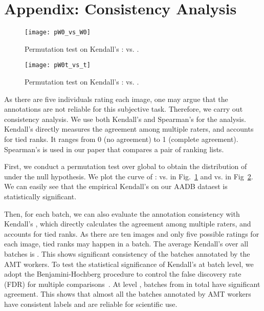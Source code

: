 \documentclass[runningheads]{llncs}
\begin{document}
\section*{Appendix: Consistency Analysis}
\label{sec:consistencyAnalysis}

\begin{figure}[t]
\centering
   \texttt{[image: pW0\_vs\_W0]}
\vspace*{-4mm}
   \caption{Permutation test on Kendall's :  vs. .}
\label{fig:pW0_vs_W0}
\end{figure}

\begin{figure}[t]
\centering
   \texttt{[image: pW0t\_vs\_t]}
\vspace*{-4mm}
   \caption{Permutation test on Kendall's :  vs. .}
\label{fig:pW0t_vs_t}
\end{figure}

As there are five individuals rating each image,
one may argue that the annotations are not reliable for this subjective task.
Therefore,
we carry out consistency analysis.
We use both Kendall's  and Spearman's  for the analysis.
Kendall's  directly measures the agreement among multiple raters, and accounts for tied ranks.
It ranges from 0 (no agreement) to 1 (complete agreement).
Spearman's  is used in our paper that compares a pair of ranking lists.

First,
we conduct a permutation test over global  to obtain the distribution of  under the null hypothesis.
We plot the curve of :  vs.  in Fig.~\ref{fig:pW0_vs_W0} and   vs.  in Fig~\ref{fig:pW0t_vs_t}.
We can easily see that the empirical Kendall's  on our AADB dataest is statistically significant.

Then,
for each batch,
we can also evaluate the annotation consistency with Kendall's ,
which directly calculates the agreement among multiple raters,
and accounts for tied ranks.
As there are ten images and only five possible ratings for each image,
tied ranks may happen in a batch.
The average Kendall's  over all batches is .
This shows significant consistency of the batches annotated by the AMT workers.
To test the statistical significance of Kendall's  at batch level,
we adopt the Benjamini-Hochberg procedure to control the false discovery rate (FDR) for multiple comparisons~\cite{benjamini2001control}.
At level ,
 batches from  in total have significant agreement.
This shows that almost all the batches annotated by AMT workers have consistent labels and are reliable for scientific use.
\end{document}
